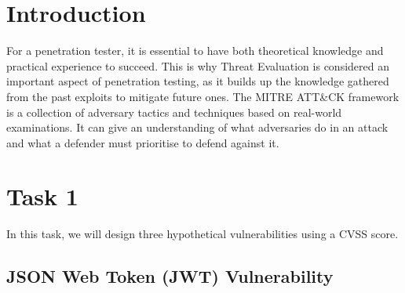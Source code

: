 \section{Introduction}
\label{lab3-Introduction}

For a penetration tester, it is essential to have both theoretical knowledge and
practical experience to succeed. This is why Threat Evaluation is considered an
important aspect of penetration testing, as it builds up the knowledge gathered
from the past exploits to mitigate future ones. The MITRE ATT\&CK
framework is a collection of adversary tactics and techniques based on
real-world examinations. It can give an understanding of what adversaries do in
an attack and what a defender must prioritise to defend against it.

\section{Task 1}
\label{lab3-Task1}
In this task, we will design three hypothetical vulnerabilities using a CVSS
score.

\subsection{JSON Web Token (JWT) Vulnerability}
\label{lab3-JWT}

